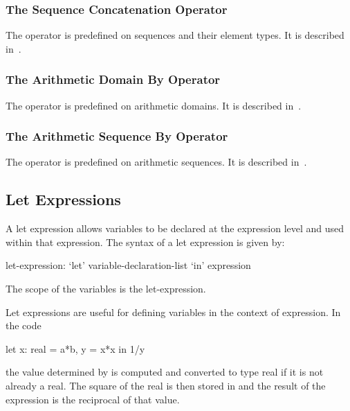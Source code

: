 \subsubsection{The Sequence Concatenation Operator}
\label{The_Sequence_Concatenation_Operator}

The operator \chpl{#} is predefined on sequences and their element
types.  It is described in~.

\subsubsection{The Arithmetic Domain By Operator}
\label{The_Arithmetic_Domain_By_Operator}

The operator  is predefined on arithmetic domains.  It is
described in~.

\subsubsection{The Arithmetic Sequence By Operator}
\label{The_Sequence_By_Operator}

The operator  is predefined on arithmetic sequences.  It is
described in~.

\subsection{Let Expressions}
\label{Let_Expressions}

A let expression allows variables to be declared at the expression
level and used within that expression.  The syntax of a let expression
is given by:
\begin{syntax}
let-expression:
  `let' variable-declaration-list `in' expression
\end{syntax}
The scope of the variables is the let-expression.
\begin{example}
Let expressions are useful for defining variables in the context of
expression.  In the code
\begin{chapel}
  let x: real = a*b, y = x*x in 1/y
\end{chapel}
the value determined by  is computed and converted to type
real if it is not already a real.  The square of the real is then
stored in  and the result of the expression is the reciprocal
of that value.
\end{example}

